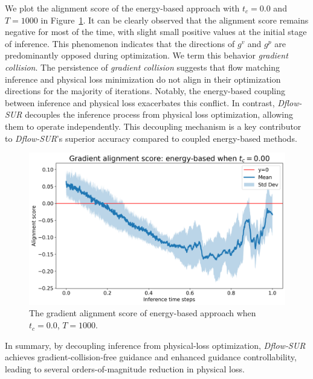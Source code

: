 We plot the alignment score of the energy-based approach with $t_c = 0.0$ and $T=1000$ in Figure~\ref{ch7:fig:alignmentScore}. It can be clearly observed that the alignment score remains negative for most of the time, with slight small positive values at the initial stage of inference. This phenomenon indicates that the directions of $g^v$ and $g^p$ are predominantly opposed during optimization. We term this behavior \textit{gradient collision}. The persistence of \textit{gradient collision} suggests that flow matching inference and physical loss minimization do not align in their optimization directions for the majority of iterations. Notably, the energy-based coupling between inference and physical loss exacerbates this conflict. In contrast, \textit{Dflow-SUR} decouples the inference process from physical loss optimization, allowing them to operate independently. This decoupling mechanism is a key contributor to \textit{Dflow-SUR}’s superior accuracy compared to coupled energy-based methods.

\begin{figure}[htbp]
    \centering
    \includegraphics[width=0.8\linewidth]{chapter7/fig/mean_std_alignment_history_0.0.png}
    \caption{The gradient alignment score of energy-based approach when $t_c = 0.0$, $T=1000$.}
    \label{ch7:fig:alignmentScore}
\end{figure}

In summary, by decoupling inference from physical‐loss optimization, \textit{Dflow‐SUR} achieves gradient‐collision‐free guidance and enhanced guidance controllability, leading to several orders-of-magnitude reduction in physical loss.


